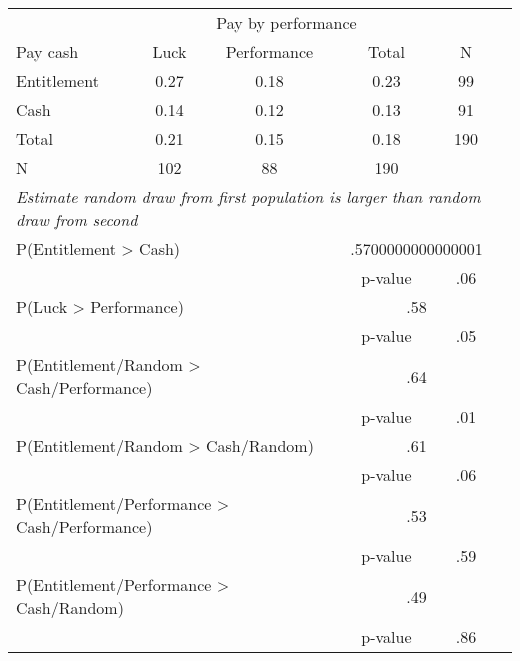 \begin{center}
 \begin{tabular}{lccccc}
  \hline\hline
 & \multicolumn{3}{c}{Pay by performance} \\
Pay cash&Luck&Performance&Total&N \\
\hline
Entitlement&0.27&0.18&0.23&99 \\
Cash&0.14&0.12&0.13&91 \\
Total&0.21&0.15&0.18&190 \\
\hline
N&102&88&190& \\
\hline\hline
\multicolumn{5}{l}{\emph{Estimate random draw from first population is larger than random draw from second}}\\
\multicolumn{3}{l}{P(Entitlement > Cash)} & \multicolumn{2}{c}{.5700000000000001}\\  
\multicolumn{3}{l}{} & p-value & \multicolumn{1}{c}{.06}\\  
\multicolumn{3}{l}{P(Luck > Performance)} & \multicolumn{2}{c}{.58}\\
\multicolumn{3}{l}{} & p-value & \multicolumn{1}{c}{.05}\\  
\multicolumn{3}{l}{P(Entitlement/Random > Cash/Performance)} & \multicolumn{2}{c}{.64}\\
\multicolumn{3}{l}{} & p-value & \multicolumn{1}{c}{.01}\\  
\multicolumn{3}{l}{P(Entitlement/Random > Cash/Random)} & \multicolumn{2}{c}{.61}\\
\multicolumn{3}{l}{} & p-value & \multicolumn{1}{c}{.06}\\  
\multicolumn{3}{l}{P(Entitlement/Performance > Cash/Performance)} & \multicolumn{2}{c}{.53}\\
\multicolumn{3}{l}{} & p-value & \multicolumn{1}{c}{.59}\\  
\multicolumn{3}{l}{P(Entitlement/Performance > Cash/Random)} & \multicolumn{2}{c}{.49}\\
\multicolumn{3}{l}{} & p-value & \multicolumn{1}{c}{.86}\\  
\hline
 \end{tabular}
\end{center}

